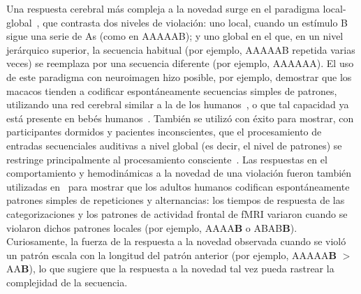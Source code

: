 
Una respuesta cerebral más compleja a la novedad surge en el paradigma local-global~\cite{f67,f68}, que contrasta dos niveles de violación: uno local, cuando un estímulo B sigue una serie de As (como en AAAAAB); y uno global en el que, en un nivel jerárquico superior, la secuencia habitual (por ejemplo, AAAAAB repetida varias veces) se reemplaza por una secuencia diferente (por ejemplo, AAAAAA). El uso de este paradigma con neuroimagen hizo posible, por ejemplo, demostrar que los macacos tienden a codificar espontáneamente secuencias simples de patrones, utilizando una red cerebral similar a la de los humanos~\cite{f13,f66,f69}, o que tal capacidad ya está presente en bebés humanos~\cite{f70}. También se utilizó con éxito para mostrar, con participantes dormidos y pacientes inconscientes, que el procesamiento de entradas secuenciales auditivas a nivel global (es decir, el nivel de patrones) se restringe principalmente al procesamiento consciente~\cite{f67,f71,f72}. Las respuestas en el comportamiento y hemodinámicas a la novedad de una violación fueron también utilizadas en~\cite{f19} para mostrar que los adultos humanos codifican espontáneamente patrones simples de repeticiones y alternancias: los tiempos de respuesta de las categorizaciones y los patrones de actividad frontal de fMRI variaron cuando se violaron dichos patrones locales (por ejemplo, AAAA\textbf{B} o ABAB\textbf{B}). Curiosamente, la fuerza de la respuesta a la novedad observada cuando se violó un patrón escala con la longitud del patrón anterior (por ejemplo, AAAAA\textbf{B} $>$ AA\textbf{B}), lo que sugiere que la respuesta a la novedad tal vez pueda rastrear la complejidad de la secuencia.

